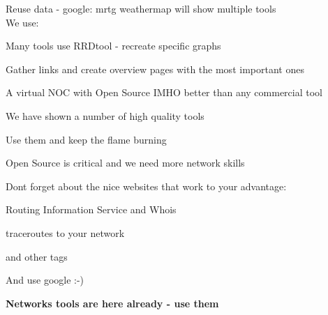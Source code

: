 \documentclass[28pt,landscape,a4paper,footrule]{foils}
\begin{document}
\begin{slidelist}
\item Reuse data - google: mrtg weathermap will show multiple tools\\
We use: 
\item Many tools use RRDtool - recreate specific graphs
\item Gather links and create overview pages with the most important ones 
\end{slidelist}

\centerline{A virtual NOC with Open Source IMHO better than any commercial tool}




\begin{slidelist}
\item We have shown a number of high quality tools
\item Use them and keep the flame burning
\item Open Source is critical and we need more network skills
\end{slidelist}




\begin{slidelist}

\item Dont forget about the nice websites that work to your advantage:
\item Routing Information Service and Whois\\
\small{} 
\item \normalsize traceroutes to your network\\
\small {} 
\item \small {}
\item {}
\item {} and other tags
\end{slidelist}
\normalsize
And use google :-)

\myquestionspage
\vskip 5mm
\centerline{\color{titlecolor}\Large \bf Networks tools are here already - use them}


\hlkprofiluk
\end{document}
